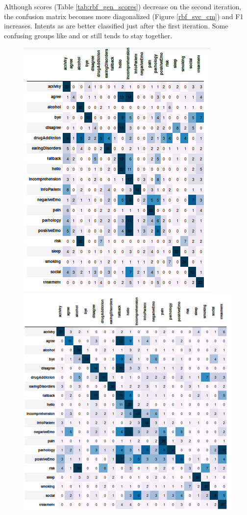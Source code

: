 \documentclass[11pt]{article}
\begin{document}
Although scores (Table \ref{tab:rbf_gen_scores}) decrease on the second iteration, the confusion matrix becomes more diagonalized (Figure \ref{rbf_svc_cm}) and F1 increases. Intents as{} are better classified just after the first iteration. Some confusing groups like {} and {} or {} still tends to stay together.

\begin{figure}[h]
	\centering
	\includegraphics[scale=0.25]{svc0_cm.png}
	\includegraphics[scale=0.25]{svc1_cm.png}

\end{figure}
\end{document}
